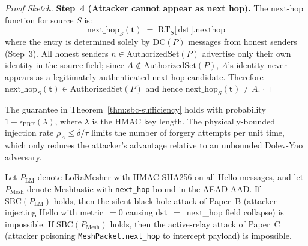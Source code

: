 \begin{proof}[Proof Sketch]
\medskip
\noindent\textbf{Step~4 (Attacker cannot appear as next hop).}\;
The next-hop function for source $S$ is:
\[
  \mathrm{next\_hop}_{S}(\mathbf{t}) \;=\;
  \mathrm{RT}_{S}\bigl[\,\mathrm{dst}\,\bigr].\mathrm{nexthop}
\]
where the entry is determined solely by $\mathrm{DC}(P)$ messages from honest
senders (Step~3).
All honest senders $n \in \mathrm{AuthorizedSet}(P)$ advertise only their own
identity in the source field; since $A \notin \mathrm{AuthorizedSet}(P)$,
$A$'s identity never appears as a legitimately authenticated next-hop
candidate.
Therefore $\mathrm{next\_hop}_{S}(\mathbf{t}) \in \mathrm{AuthorizedSet}(P)$
and hence $\mathrm{next\_hop}_{S}(\mathbf{t}) \neq A$.
\hfill$\square$
\end{proof}

\begin{remark}
The guarantee in Theorem~\ref{thm:sbc-sufficiency} holds with probability
$1 - \epsilon_{\mathrm{PRF}}(\lambda)$, where $\lambda$ is the HMAC key length.
The physically-bounded injection rate $\rho_{A} \leq \delta/\tau$ limits the
number of forgery attempts per unit time, which only reduces the attacker's
advantage relative to an unbounded Dolev-Yao adversary.
\end{remark}


\begin{corollary}
\label{cor:bc-impossible}
Let $P_{\mathrm{LM}}$ denote LoRaMesher with HMAC-SHA256 on all Hello messages,
and let $P_{\mathrm{Mesh}}$ denote Meshtastic with \texttt{next\_hop} bound in the
AEAD AAD.
If $\mathrm{SBC}(P_{\mathrm{LM}})$ holds, then the silent black-hole attack of
Paper~B (attacker injecting Hello with metric~$= 0$ causing dst~$=$~next\_hop
field collapse) is impossible.
If $\mathrm{SBC}(P_{\mathrm{Mesh}})$ holds, then the active-relay attack of
Paper~C (attacker poisoning \texttt{MeshPacket.next\_hop} to intercept payload)
is impossible.
\end{corollary}

